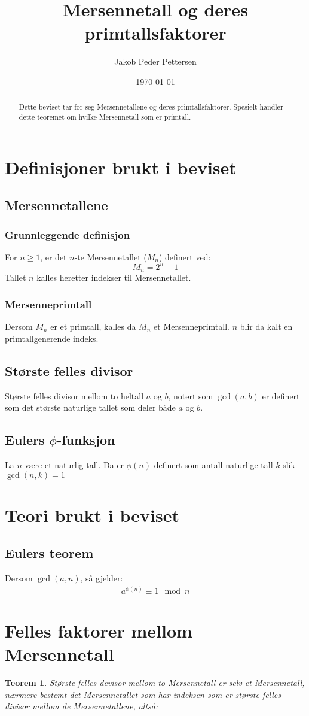\documentclass[a4paper,twoside]{article}
\title{Mersennetall og deres primtallsfaktorer}
\author{Jakob Peder Pettersen}
\date{\today}
\theoremstyle{plain}
\newtheorem{thm}{Teorem}[section]
\begin{document}
\maketitle
\begin{abstract}
Dette beviset tar for seg Mersennetallene og deres primtallsfaktorer. Spesielt handler dette teoremet om hvilke Mersennetall som er primtall.
\end{abstract}
\tableofcontents \newpage
\section{Definisjoner brukt i beviset}
\subsection{Mersennetallene}
\subsubsection{Grunnleggende definisjon}
For $n\geq 1$, er det $n$-te Mersennetallet ($M_n$) definert ved:
\[
M_n=2^{n}-1
\]
Tallet $n$ kalles heretter indekser til Mersennetallet.
\subsubsection{Mersenneprimtall}
Dersom $M_n$ er et primtall, kalles da $M_n$ et Mersenneprimtall. $n$ blir da kalt en primtallgenerende indeks.
\subsection{Største felles divisor}
Største felles divisor mellom to heltall $a$ og $b$, notert som $\gcd\left(a,b\right)$ er definert som det største naturlige tallet som deler både $a$ og $b$.
\subsection{Eulers $\phi$-funksjon}
La $n$ være et naturlig tall. Da er $\phi(n)$ definert som antall naturlige tall $k$ slik $\gcd(n,k)=1$
\section{Teori brukt i beviset}
\subsection{Eulers teorem}
Dersom $\gcd(a,n)$, så gjelder:
\begin{align}
	a^{\phi(n)} \equiv 1 \mod n
\end{align}
\section{Felles faktorer mellom Mersennetall}
\begin{thm}
	Største felles devisor mellom to Mersennetall er selv et Mersennetall, nærmere bestemt det Mersennetallet som har indeksen som er største felles divisor mellom de  Mersennetallene, altså:\[ \]
\end{thm}
\end{document}
